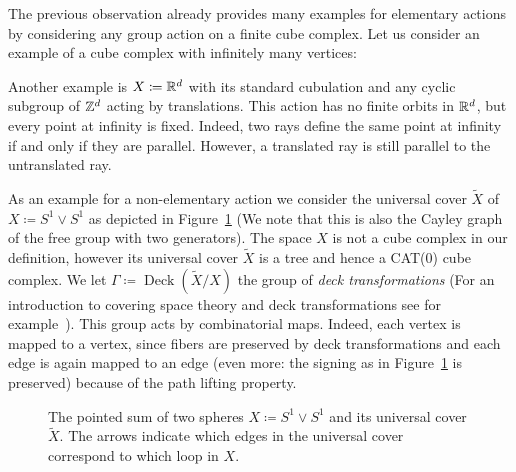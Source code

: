 The previous observation already provides many examples for elementary actions by considering any group action on a finite cube complex. Let us consider an example of a cube complex with infinitely many vertices:

\begin{bsp}[\(\R^d\)]
  Another example is \(X \coloneqq \mathbb{R}^d\) with its standard cubulation and any cyclic subgroup of \(\mathbb{Z}^d\) acting by translations. This action has no finite orbits in \(\R^d\), but every point at infinity is fixed. Indeed, two rays define the same point at infinity if and only if they are parallel. However, a translated ray is still parallel to the untranslated ray.

  As an example for a non-elementary action we consider the universal cover \(\tilde X\) of \(X \coloneqq S^1 \vee S^1\) as depicted in Figure~\ref{fig:figure-8} (We note that this is also the Cayley graph of the free group with two generators). The space \(X\) is not a cube complex in our definition, however its universal cover \(\tilde X\) is a tree and hence a CAT(0) cube complex. We let \(\Gamma \coloneqq \operatorname{Deck}(\tilde X/X)\) the group of \emph{deck transformations} (For an introduction to covering space theory and deck transformations see for example~\cite[Section~1.3]{hatcher}). This group acts by combinatorial maps. Indeed, each vertex is mapped to a vertex, since fibers are preserved by deck transformations and each edge is again mapped to an edge (even more: the signing as in Figure~\ref{fig:figure-8} is preserved) because of the path lifting property. 
  \begin{figure}[htbp]
    \centering
    
    \caption{The pointed sum of two spheres \(X \coloneqq S^1 \vee S^1\) and its universal cover\(\tilde X\). The arrows indicate which edges in the universal cover correspond to which loop in \(X\).}
    \label{fig:figure-8}
  \end{figure}


\end{bsp}
